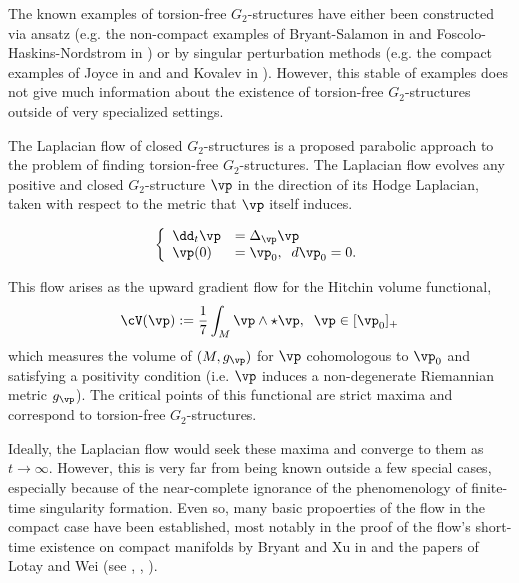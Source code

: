 \documentclass[hidelinks, 12pt, oneside, reqno]{amsart}
\begin{document}
The known examples of torsion-free $G_2$-structures have either been constructed via ansatz (e.g. the non-compact examples of Bryant-Salamon in \cite{BryantSalamonExceptionalHolonomy} and Foscolo-Haskins-Nordstrom in \cite{FoscoloHaskinsNordstromALC}) or by singular perturbation methods (e.g. the compact examples of Joyce in \cite{JoyceG2I} and \cite{JoyceG2II} and Kovalev in \cite{KovalevTwistedConnectedSums}). However, this stable of examples does not give much information about the existence of torsion-free $G_2$-structures outside of very specialized settings. 

The Laplacian flow of closed $G_2$-structures is a proposed parabolic approach to the problem of finding torsion-free $G_2$-structures. The Laplacian flow evolves any positive and closed $G_2$-structure $\vp$ in the direction of its Hodge Laplacian, taken with respect to the metric that $\vp$ itself induces. 

\begin{equation}\label{equation laplacian flow intro}
    \left\{
    \begin{array}{ll}
      \dd_t \vp &=   \Delta_{\vp} \vp\\
      \vp(0) &= \vp_0, \;\; d\vp_0 = 0.
    \end{array}
  \right.
\end{equation}

This flow arises as the upward gradient flow for the Hitchin volume functional,
\[
\cV(\vp) := \frac17 \int_M \vp \wedge \star \vp, \;\; \vp \in [\vp_0]_+
\]
which measures the volume of $(M,g_\vp)$ for $\vp$ cohomologous to $\vp_0$ and satisfying a positivity condition (i.e. $\vp$ induces a non-degenerate Riemannian metric $g_\vp$). The critical points of this functional are strict maxima and correspond to torsion-free $G_2$-structures. 

Ideally, the Laplacian flow would seek these maxima and converge to them as $t \rightarrow \infty$. However, this is very far from being known outside a few special cases, especially because of the near-complete ignorance of the phenomenology of finite-time singularity formation. Even so, many basic propoerties of the flow in the compact case have been established, most notably in the proof of the flow's short-time existence on compact manifolds by Bryant and Xu in \cite{BryantXu} and the papers of Lotay and Wei (see \cite{LotayWeiLaplacianFlow}, \cite{LotayWeiStability}, \cite{LotayWeiRealAnalyticity}). 
\end{document}
